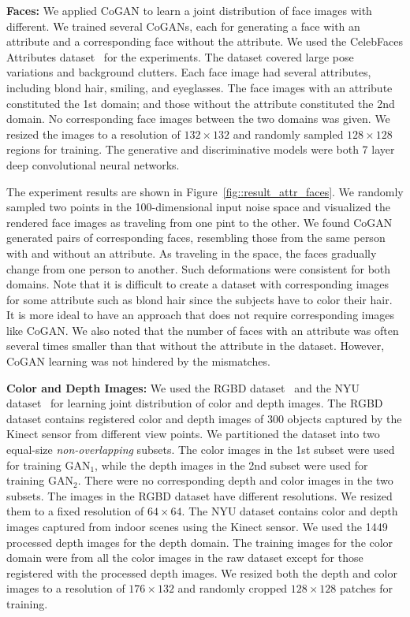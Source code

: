 \documentclass{article}
\begin{document}
{\bf Faces:} We applied CoGAN to learn a joint distribution of face images with different. We trained several CoGANs, each for generating a face with an attribute and a corresponding face without the attribute. We used the CelebFaces Attributes dataset~\cite{liu2015deep} for the experiments. The dataset covered large pose variations and background clutters. Each face image had several attributes, including blond hair, smiling, and eyeglasses. The face images with an attribute constituted the 1st domain; and those without the attribute constituted the 2nd domain. No corresponding face images between the two domains was given. We resized the images to a resolution of $132\times132$ and randomly sampled $128\times128$ regions for training. The generative and discriminative models were both 7 layer deep convolutional neural networks. 

The experiment results are shown in Figure~\ref{fig::result_attr_faces}. We randomly sampled two points in the 100-dimensional input noise space and visualized the rendered face images as traveling from one pint to the other. We found CoGAN generated pairs of corresponding faces, resembling those from the same person with and without an attribute. As traveling in the space, the faces gradually change from one person to another. Such deformations were consistent for both domains. Note that it is difficult to create a dataset with corresponding images for some attribute such as blond hair since the subjects have to color their hair. It is more ideal to have an approach that does not require corresponding images like CoGAN. We also noted that the number of faces with an attribute was often several times smaller than that without the attribute in the dataset. However, CoGAN learning was not hindered by the mismatches.

{\bf Color and Depth Images:} We used the RGBD dataset~\cite{lai2011large} and the NYU dataset~\cite{silberman2012indoor} for learning joint distribution of color and depth images. The RGBD dataset contains registered color and depth images of 300 objects captured by the Kinect sensor from different view points. We partitioned the dataset into two equal-size {\it non-overlapping} subsets. The color images in the 1st subset were used for training $\text{GAN}_1$, while the depth images in the 2nd subset were used for training $\text{GAN}_2$. There were no corresponding depth and color images in the two subsets. The images in the RGBD dataset have different resolutions. We resized them to a fixed resolution of $64\times64$. The NYU dataset contains color and depth images captured from indoor scenes using the Kinect sensor. We used the 1449 processed depth images for the depth domain. The training images for the color domain were from all the color images in the raw dataset except for those registered with the processed depth images. We resized both the depth and color images to a resolution of $176\times132$ and randomly cropped $128\times128$ patches for training. 
\end{document}
